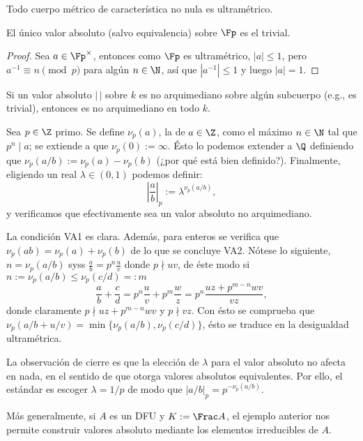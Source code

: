 \documentclass[teoria-numeros.tex]{subfiles}
\begin{document}
\begin{cor}
	Todo cuerpo métrico de característica no nula es ultramétrico.
\end{cor}

\begin{cor}
	El único valor absoluto (salvo equivalencia) sobre $\Fp$ es el trivial.
\end{cor}
\begin{proof}
	Sea $a \in \Fp^\times$, entonces como $\Fp$ es ultramétrico, $|a| \le 1$, pero $a^{-1} \equiv n \pmod p$ para algún $n \in \N$,
	así que $|a^{-1}| \le 1$ y luego $|a| = 1$.
\end{proof}

\begin{cor}\label{thm:archimedian_over_subflds}
	Si un valor absoluto $|\,|$ sobre $k$ es no arquimediano sobre algún subcuerpo (e.g., es trivial), entonces es no arquimediano en todo $k$.
\end{cor}

\begin{exn}
	Sea $p \in \Z$ primo.
	Se define $\nu_p(a)$, la  de $a \in \Z$, como el máximo $n \in \N$ tal que $p^n \mid a$;
	se extiende a que $\nu_p(0) := \infty$.
	Ésto lo podemos extender a $\Q$ definiendo que $\nu_p(a/b) := \nu_p(a) - \nu_p(b)$ (¿por qué está bien definido?).
	Finalmente, eligiendo un real $\lambda \in (0, 1)$ podemos definir:
	$$ \left| \frac{a}{b} \right|_p := \lambda^{\nu_p(a/b)}, $$
	y verificamos que efectivamente sea un valor absoluto no arquimediano.

	La condición VA1 es clara.
	Además, para enteros se verifica que $\nu_p(ab) = \nu_p(a) + \nu_p(b)$ de lo que se concluye VA2.
	Nótese lo siguiente, $n = \nu_p(a/b)$ syss $\frac{a}{b} = p^n \frac{u}{v}$ donde $p \nmid uv$, de éste modo si $n := \nu_p(a / b) \le \nu_p(c/d) =: m$
	$$ \frac{a}{b} + \frac{c}{d} = p^n \frac{u}{v} + p^m \frac{w}{z} = p^n \frac{uz + p^{m-n}wv}{vz}, $$
	donde claramente $p \nmid uz + p^{m-n}wv$ y $p\nmid vz$.
	Con ésto se comprueba que $\nu_p(a/b + u/v) = \min\{ \nu_p(a/b), \nu_p(c/d) \}$, ésto se traduce en la desigualdad ultramétrica.

	La observación de cierre es que la elección de $\lambda$ para el valor absoluto no afecta en nada, en el sentido de que otorga valores absolutos
	equivalentes. Por ello, el estándar es escoger $\lambda = 1/p$ de modo que $| a/b |_p = p^{-\nu_p(a/b)}$.
\end{exn}
Más generalmente, si $A$ es un DFU y $K := \Frac A$, el ejemplo anterior nos permite construir valores absoluto mediante los elementos irreducibles de $A$.
\end{document}
